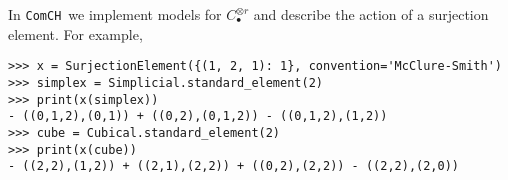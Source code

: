 \documentclass{amsart}
\newcommand{\comch}{\texttt{ComCH}}
\begin{document}
In \comch\, we implement models for $C_\bullet^{\otimes r}$ and describe the action of a surjection element. For example,
\begin{verbatim}
>>> x = SurjectionElement({(1, 2, 1): 1}, convention='McClure-Smith')
>>> simplex = Simplicial.standard_element(2)
>>> print(x(simplex))
- ((0,1,2),(0,1)) + ((0,2),(0,1,2)) - ((0,1,2),(1,2))
>>> cube = Cubical.standard_element(2)
>>> print(x(cube))
- ((2,2),(1,2)) + ((2,1),(2,2)) + ((0,2),(2,2)) - ((2,2),(2,0))
\end{verbatim}




\end{document}
